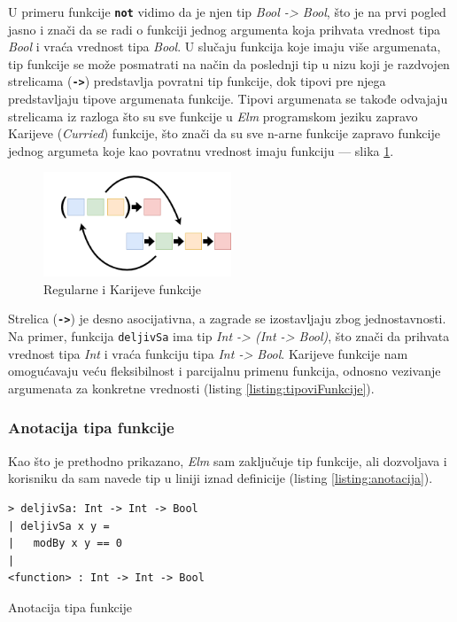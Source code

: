 \documentclass[12pt,oneside]{memoir}
\begin{document}
U primeru funkcije \texttt{\textbf{not}} vidimo da je njen tip \emph{Bool -> Bool},
što je na prvi pogled jasno i znači da se radi o funkciji jednog argumenta koja
prihvata vrednost tipa \emph{Bool} i vraća vrednost tipa \emph{Bool}. U slučaju
funkcija koje imaju više argumenata, tip funkcije se može
posmatrati na način da poslednji tip u nizu koji je razdvojen strelicama
(\texttt{\textbf{->}}) predstavlja povratni tip funkcije, dok tipovi pre njega 
predstavljaju tipove argumenata funkcije. Tipovi argumenata se takođe odvajaju strelicama
iz razloga što su sve funkcije u \emph{Elm} programskom jeziku zapravo Karijeve (\emph{Curried}) funkcije,
što znači da su sve n-arne funkcije zapravo funkcije jednog argumeta
koje kao povratnu vrednost imaju funkciju --- slika \ref{fig:currying}.
\begin{figure}[!h]
  \centering
  \includegraphics[width=0.5\textwidth]{currying.png}
  \caption{Regularne i Karijeve funkcije}
  \label{fig:currying}
\end{figure}
Strelica (\texttt{\textbf{->}}) je desno asocijativna, a zagrade se izostavljaju zbog
jednostavnosti. Na primer, funkcija \texttt{deljivSa} ima tip \emph{Int -> (Int -> Bool)},
što znači da prihvata vrednost tipa \emph{Int} i vraća funkciju tipa \emph{Int -> Bool}.
Karijeve funkcije nam omogućavaju veću fleksibilnost i parcijalnu primenu funkcija, 
odnosno vezivanje argumenata za konkretne vrednosti (listing \ref{listing:tipoviFunkcije}).

\subsubsection{Anotacija tipa funkcije}
Kao što je prethodno prikazano, \emph{Elm} sam zaključuje tip funkcije, ali dozvoljava i korisniku
da sam navede tip u liniji iznad definicije (listing \ref{listing:anotacija}).
\begin{listing}[!h]
\begin{verbatim}
> deljivSa: Int -> Int -> Bool
| deljivSa x y =
|   modBy x y == 0
|
<function> : Int -> Int -> Bool
\end{verbatim}
\caption{Anotacija tipa funkcije}
\label{listing:anotacija}
\end{listing}
\end{document}
